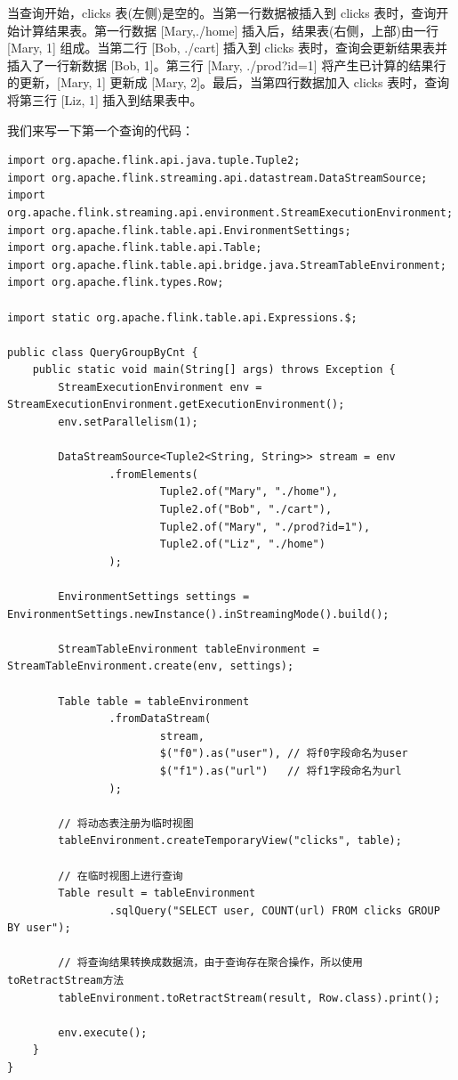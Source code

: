 \documentclass[cn,11pt,chinese]{elegantbook}
\begin{document}
当查询开始，clicks 表(左侧)是空的。当第一行数据被插入到 clicks 表时，查询开始计算结果表。第一行数据 [Mary,./home] 插入后，结果表(右侧，上部)由一行 [Mary, 1] 组成。当第二行 [Bob, ./cart] 插入到 clicks 表时，查询会更新结果表并插入了一行新数据 [Bob, 1]。第三行 [Mary, ./prod?id=1] 将产生已计算的结果行的更新，[Mary, 1] 更新成 [Mary, 2]。最后，当第四行数据加入 clicks 表时，查询将第三行 [Liz, 1] 插入到结果表中。

我们来写一下第一个查询的代码：

\begin{verbatim}
import org.apache.flink.api.java.tuple.Tuple2;
import org.apache.flink.streaming.api.datastream.DataStreamSource;
import org.apache.flink.streaming.api.environment.StreamExecutionEnvironment;
import org.apache.flink.table.api.EnvironmentSettings;
import org.apache.flink.table.api.Table;
import org.apache.flink.table.api.bridge.java.StreamTableEnvironment;
import org.apache.flink.types.Row;

import static org.apache.flink.table.api.Expressions.$;

public class QueryGroupByCnt {
    public static void main(String[] args) throws Exception {
        StreamExecutionEnvironment env = StreamExecutionEnvironment.getExecutionEnvironment();
        env.setParallelism(1);

        DataStreamSource<Tuple2<String, String>> stream = env
                .fromElements(
                        Tuple2.of("Mary", "./home"),
                        Tuple2.of("Bob", "./cart"),
                        Tuple2.of("Mary", "./prod?id=1"),
                        Tuple2.of("Liz", "./home")
                );

        EnvironmentSettings settings = EnvironmentSettings.newInstance().inStreamingMode().build();

        StreamTableEnvironment tableEnvironment = StreamTableEnvironment.create(env, settings);

        Table table = tableEnvironment
                .fromDataStream(
                        stream,
                        $("f0").as("user"), // 将f0字段命名为user
                        $("f1").as("url")   // 将f1字段命名为url
                );

        // 将动态表注册为临时视图
        tableEnvironment.createTemporaryView("clicks", table);

        // 在临时视图上进行查询
        Table result = tableEnvironment
                .sqlQuery("SELECT user, COUNT(url) FROM clicks GROUP BY user");

        // 将查询结果转换成数据流，由于查询存在聚合操作，所以使用toRetractStream方法
        tableEnvironment.toRetractStream(result, Row.class).print();

        env.execute();
    }
}
\end{verbatim}
\end{document}
